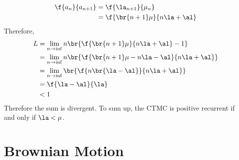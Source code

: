 \documentclass{article}
\begin{document}
\begin{example}
\begin{align*}
        \f{a_{n}}{a_{n+1}} &= \f{\la_{n+1}}{\mu_n} \\
        &= \f{\br{n+1} \mu }{n \la + \al}
        \end{align*}
        Therefore,
        \begin{align*}
            L &= \lim_{n\to \inf} n \br{\f{\br{n+1} \mu }{n \la + \al} - 1} \\
            &= \lim_{n\to \inf} n \br{\f{\br{n+1} \mu - n \la - \al}{n \la + \al}} \\
            &= \lim_{n\to \inf} \br{\f{n \br{\la - \al}}{n \la + \al}} \\
            &= \f{\la - \al}{\la} \\
            &< 1
        \end{align*}
        Therefore the sum is divergent. To sum up, the CTMC is positive recurrent if and only if $\la < \mu$.
    \end{example}
    \section{Brownian Motion}
\end{document}
